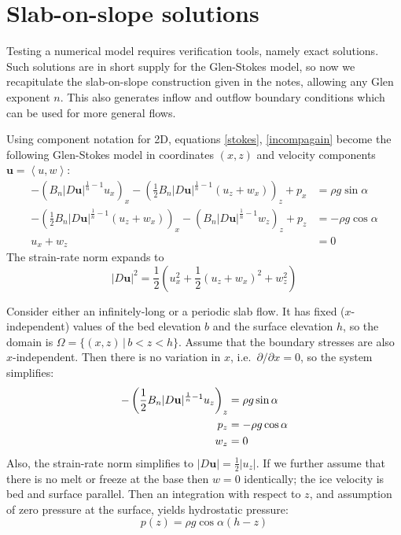 \documentclass[letterpaper,final,12pt,reqno]{amsart}
\newcommand{\bu}{\mathbf{u}}
\begin{document}
\section{Slab-on-slope solutions}  \label{sec:slab}

Testing a numerical model requires verification tools, namely exact solutions.  Such solutions are in short supply for the Glen-Stokes model, so now we recapitulate the slab-on-slope construction given in the notes, allowing any Glen exponent $n$.  This also generates inflow and outflow boundary conditions which can be used for more general flows.

Using component notation for 2D, equations \eqref{stokes}, \eqref{incompagain} become the following Glen-Stokes model in coordinates $(x,z)$ and velocity components $\bu=\left<u,w\right>$:
\begin{align}
- \left(B_n |D\bu|^{\frac{1}{n}-1} u_x\right)_x - \left(\frac{1}{2} B_n |D\bu|^{\frac{1}{n}-1} \left(u_z+w_x\right)\right)_z + p_x &= \rho g\sin\alpha \label{planestressx} \\
- \left(\frac{1}{2} B_n |D\bu|^{\frac{1}{n}-1} \left(u_z+w_x\right)\right)_x - \left(B_n |D\bu|^{\frac{1}{n}-1} w_z\right)_z + p_z &= -\rho g\cos\alpha \label{planestressz} \\
u_x + w_z &= 0 \label{planeincomp}
\end{align}
The strain-rate norm expands to
\begin{equation}
    |D\bu|^2 = \frac{1}{2} \left(u_x^2 + \frac{1}{2}(u_z+w_x)^2 + w_z^2\right)  \label{planeDnorm}
\end{equation}

Consider either an infinitely-long or a periodic slab flow.  It has fixed ($x$-independent) values of the bed elevation $b$ and the surface elevation $h$, so the domain is $\Omega = \{(x,z)\,|\,b < z < h\}$.  Assume that the boundary stresses are also $x$-independent.  Then there is no variation in $x$, i.e.~$\partial/\partial x=0$, so the system simplifies:
\begin{align}
- \left(\frac{1}{2}B_n |D\bu|^{\frac{1}{n}-1} u_z\right)_z &= \rho g\sin\alpha \label{slabstresses} \\
p_z &= -\rho g\cos\alpha \notag \\
w_z &= 0 \notag
\end{align}
Also, the strain-rate norm simplifies to $|D\bu| = \frac{1}{2} |u_z|$.  If we further assume that there is no melt or freeze at the base then $w=0$ identically; the ice velocity is bed and surface parallel.  Then an integration with respect to $z$, and assumption of zero pressure at the surface, yields hydrostatic pressure:
\begin{equation}
p(z) = \rho g\cos\alpha (h-z)  \label{pslab}
\end{equation}
\end{document}
